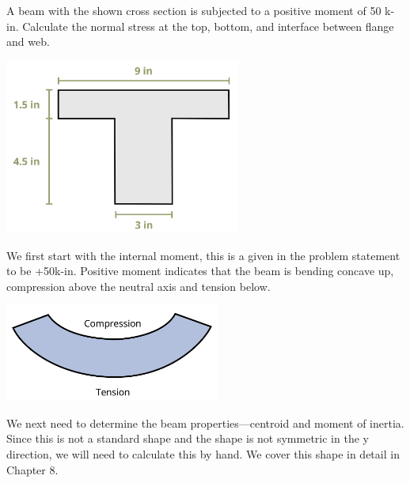 \documentclass[
  letterpaper,
  DIV=11,
  numbers=noendperiod]{scrreprt}
\begin{document}
\begin{tcolorbox}[enhanced jigsaw, colbacktitle=quarto-callout-note-color!10!white, title={Example 9.1: Simple bending stress problem\,}, coltitle=black, leftrule=.75mm, rightrule=.15mm, opacityback=0, breakable, colframe=quarto-callout-note-color-frame, left=2mm, arc=.35mm, colback=white, bottomrule=.15mm, bottomtitle=1mm, toptitle=1mm, titlerule=0mm, opacitybacktitle=0.6, toprule=.15mm]

A beam with the shown cross section is subjected to a positive moment of
50 k-in. Calculate the normal stress at the top, bottom, and interface
between flange and web.

\begin{center}
\includegraphics[width=3.04167in,height=\textheight]{images/CH9 PNGs/Example 9.1 part 1.png}
\end{center}

We first start with the internal moment, this is a given in the problem
statement to be +50k-in. Positive moment indicates that the beam is
bending concave up, compression above the neutral axis and tension
below.

\begin{center}
\includegraphics[width=2.78125in,height=\textheight]{images/CH9 PNGs/Example 9.1 part 2.png}
\end{center}

We next need to determine the beam properties---centroid and moment of
inertia. Since this is not a standard shape and the shape is not
symmetric in the y direction, we will need to calculate this by hand. We
cover this shape in detail in Chapter 8.


\end{tcolorbox}
\end{document}
